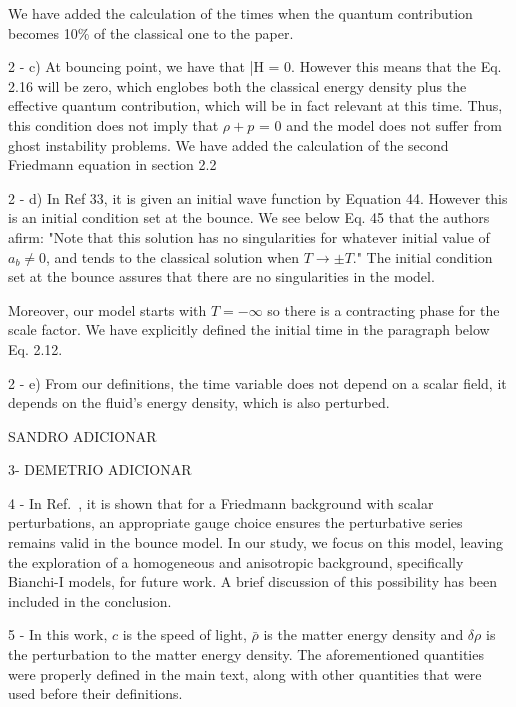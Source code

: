 \documentclass[a4paper,11pt]{article}
\begin{document}
We have added the calculation of the times when the quantum contribution becomes 10\% of the classical one to the paper.

2 - c) At bouncing point, we have that \bar{H} = 0. However this means that the Eq. 2.16 will be zero, which englobes both the classical energy density plus the effective quantum contribution, which will be in fact relevant at this time. Thus, this condition does not imply that $\rho + p$ = 0 and the model does not suffer from ghost instability problems. We have added the calculation of the second Friedmann equation in section 2.2  

2 - d) In Ref 33, it is given an initial wave function by Equation 44. However this is an initial condition set at the bounce. We see below Eq. 45 that the authors afirm: "Note that this solution has no singularities for whatever initial value of $a_b \neq 0$, and
tends to the classical solution when $T \rightarrow \pm T$." The initial condition set at the bounce assures that there are no singularities in the model.

Moreover, our model starts with $T = -\infty$ so there is a contracting phase for the scale factor. We have explicitly defined the initial time in the paragraph below Eq. 2.12.

2 - e) From our definitions, the time variable does not depend on a scalar field, it depends on the fluid's energy density, which is also perturbed.

SANDRO ADICIONAR

3- DEMETRIO ADICIONAR

4 - In Ref.~\cite{vitenti}, it is shown that for a Friedmann background with scalar perturbations, an appropriate gauge choice ensures the perturbative series remains valid in the bounce model. In our study, we focus on this model, leaving the exploration of a homogeneous and anisotropic background, specifically Bianchi-I models, for future work. A brief discussion of this possibility has been included in the conclusion.

5 - In this work, $c$ is the speed of light, $\bar{\rho}$ is the matter energy density and $\delta\rho$ is the perturbation to the matter energy density. The aforementioned quantities were properly defined in the main text, along with other quantities that were used before their definitions. 



\end{document}
